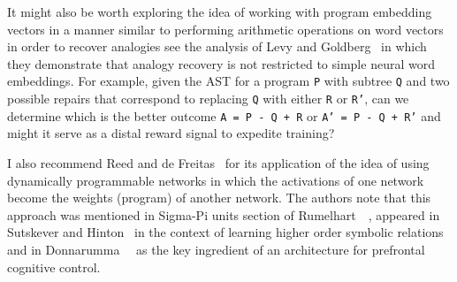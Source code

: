 It might also be worth exploring the idea of working with program embedding vectors in a manner similar to performing arithmetic operations on word vectors in order to recover analogies \emdash{} see the analysis of Levy and Goldberg~\cite{LevyandGoldbergCONIL-14} in which they demonstrate that analogy recovery is not restricted to simple neural word embeddings. For example, given the AST for a program {\tt{P}} with subtree {\tt{Q}} and two possible repairs that correspond to replacing {\tt{Q}} with either {\tt{R}} or {\tt{R'}}, can we determine which is the better outcome {\tt{A = P - Q + R}} or {\tt{A' = P - Q + R'}} and might it serve as a distal reward signal to expedite training?

I also recommend Reed and de Freitas~\cite{ReedandDeFreitasCoRR-15} for its application of the idea of using dynamically programmable networks in which the activations of one network become the weights (program) of another network.  The authors note that this approach was mentioned in Sigma-Pi units section of Rumelhart~\etal{}~\cite{RumelhartetalPDP-86b}, appeared in Sutskever and Hinton~\cite{SutskeverandHintonNIPS-09} in the context of learning higher order symbolic relations and in Donnarumma~\etal{}~\cite{DonnarummaetalIJNS-15} as the key ingredient of an architecture for prefrontal cognitive control.



